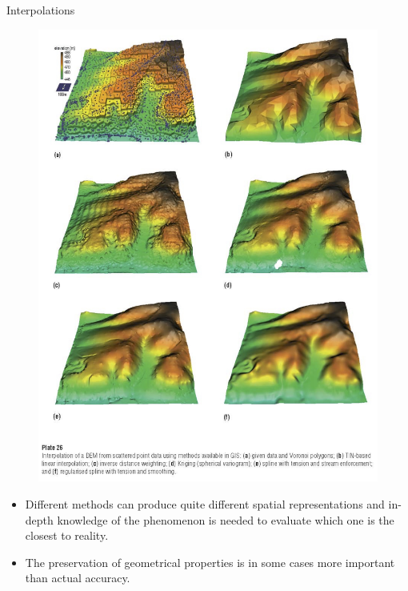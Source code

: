 \documentclass{beamer}
\begin{document}
\begin{frame}{Interpolations}
    \begin{minipage}{0.58\textwidth}
        \begin{figure}
            \centering
            \includegraphics[width=\textwidth]{img/appendix/Aim2/interpolation.jpg}
        \end{figure}
    \end{minipage}
    \begin{minipage}{0.38\textwidth}
        \small
        \begin{itemize}
            \item Different methods can produce quite different spatial representations and in-depth knowledge of the phenomenon is needed to evaluate which one is the closest to reality.
            \item The preservation of geometrical properties is in some cases more important than actual accuracy.
        \end{itemize}
    \end{minipage}
\end{frame}
\end{document}
